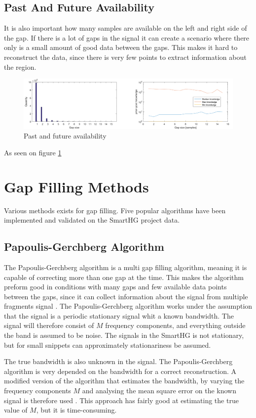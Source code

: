 \subsection{Past And Future Availability}
It is also important how many samples are available on the left and right side of the gap. If there is a lot of gaps in the signal it can create a scenario where there only is a small amount of good data between the gaps. This makes it hard to reconstruct the data, since there is very few points to extract information about the region. 
\begin{figure}[H]
\centering
\includegraphics[width=1\textwidth]{billeder/GapInfo.png}
\caption{Past and future availability}
\label{fig:PAF}
\end{figure}
As seen on figure \ref{fig:PAF} 

\section{Gap Filling Methods}
Various methods exists for gap filling. Five popular algorithms have been implemented and validated on the SmartHG project data.

\subsection{Papoulis-Gerchberg Algorithm}
\label{T:PGA}
The Papoulis-Gerchberg algorithm is a multi gap filling algorithm, meaning it is capable of correcting more than one gap at the time. This makes the algorithm preform good in conditions with many gaps and few available data points between the gaps, since it can collect information about the signal from multiple fragments signal \citep{RefWorks:11}. The Papoulis-Gerchberg algorithm works under the assumption that the signal is a periodic stationary signal whit a known bandwidth. The signal will therefore consist of $M$ frequency components, and everything outside the band is assumed to be noise. The signals in the SmartHG is not stationary, but for small snippets can approximately stationariness be assumed. 

The true bandwidth is also unknown in the signal. The Papoulis-Gerchberg algorithm is very depended on the bandwidth for a correct reconstruction. A modified version of the algorithm that estimates the bandwidth, by varying the frequency components $M$ and analysing the mean square error on the known signal is therefore used \cite{RefWorks:13}. This approach has fairly good at estimating the true value of $M$, but it is time-consuming.


